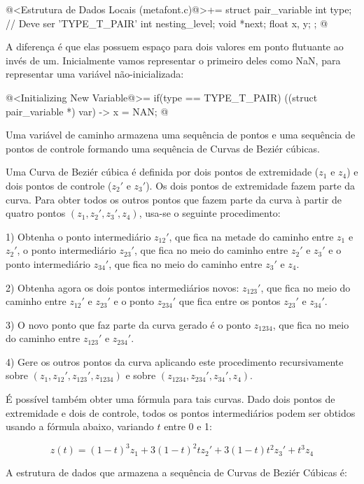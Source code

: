 \iniciocodigo
@<Estrutura de Dados Locais (metafont.c)@>+=
struct pair_variable{
  int type; // Deve ser 'TYPE_T_PAIR'
  int nesting_level;
  void *next;
  float x, y;
};
@
\fimcodigo

A diferença é que elas possuem espaço para dois valores em ponto
flutuante ao invés de um. Inicialmente vamos representar o primeiro
deles como NaN, para representar uma variável não-inicializada:

\iniciocodigo
@<Initializing New Variable@>=
if(type == TYPE_T_PAIR){
  ((struct pair_variable *) var) -> x = NAN;
}
@
\fimcodigo


Uma variável de caminho armazena uma sequência de pontos e uma
sequência de pontos de controle formando uma sequência de Curvas de
Beziér cúbicas.

Uma Curva de Beziér cúbica é definida por dois pontos de extremidade
($z_1$ e $z_4$) e dois pontos de controle ($z_2'$ e $z_3'$). Os dois
pontos de extremidade fazem parte da curva. Para obter todos os outros
pontos que fazem parte da curva à partir de quatro pontos $(z_1, z_2',
z_3', z_4)$, usa-se o seguinte procedimento:

1) Obtenha o ponto intermediário $z_{12}'$, que fica na metade do
caminho entre $z_1$ e $z_2'$, o ponto intermediário $z_{23}'$, que
fica no meio do caminho entre $z_2'$ e $z_3'$ e o ponto intermediário
$z_{34}'$, que fica no meio do caminho entre $z_3'$ e $z_4$.

2) Obtenha agora os dois pontos intermediários novos: $z_{123}'$, que
fica no meio do caminho entre $z_{12}'$ e $z_{23}'$ e o ponto
$z_{234}'$ que fica entre os pontos $z_{23}'$ e $z_{34}'$.

3) O novo ponto que faz parte da curva gerado é o ponto $z_{1234}$,
que fica no meio do caminho entre $z_{123}'$ e $z_{234}'$.

4) Gere os outros pontos da curva aplicando este procedimento
recursivamente sobre $(z_1, z_{12}', z_{123}', z_{1234})$ e sobre
$(z_{1234}, z_{234}', z_{34}', z_4)$.

É possível também obter uma fórmula para tais curvas. Dado dois pontos
de extremidade e dois de controle, todos os pontos intermediários
podem ser obtidos usando a fórmula abaixo, variando $t$ entre 0 e 1:

$$
z(t) = (1-t)^3z_1 + 3(1-t)^2tz_2' + 3(1-t)t^2z_3'+t^3z_4
$$

A estrutura de dados que armazena a sequência de Curvas de Beziér
Cúbicas é:

